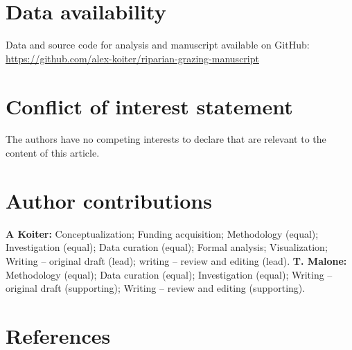 \documentclass[
]{agujournal2019}
\begin{document}
\section*{Data availability}\label{data-availability}

Data and source code for analysis and manuscript available on GitHub:
\url{https://github.com/alex-koiter/riparian-grazing-manuscript}

\section*{Conflict of interest
statement}\label{conflict-of-interest-statement}

The authors have no competing interests to declare that are relevant to
the content of this article.

\section*{Author contributions}\label{author-contributions}

\textbf{A Koiter:} Conceptualization; Funding acquisition; Methodology
(equal); Investigation (equal); Data curation (equal); Formal analysis;
Visualization; Writing -- original draft (lead); writing -- review and
editing (lead). \textbf{T. Malone:} Methodology (equal); Data curation
(equal); Investigation (equal); Writing -- original draft (supporting);
Writing -- review and editing (supporting).

\section*{References}\label{references}
\end{document}
